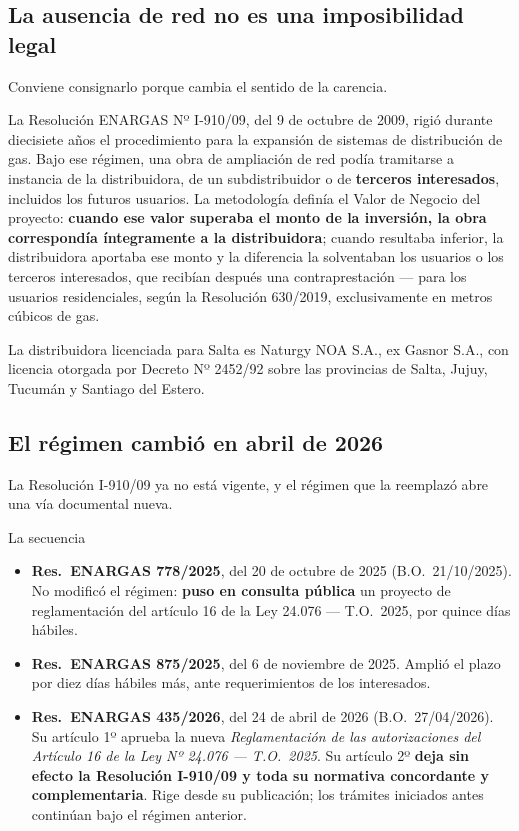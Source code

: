 \subsection*{La ausencia de red no es una imposibilidad legal}

Conviene consignarlo porque cambia el sentido de la carencia.

La Resolución ENARGAS Nº I-910/09, del 9 de octubre de 2009, rigió durante diecisiete años el procedimiento para la expansión de sistemas de distribución de gas. Bajo ese régimen, una obra de ampliación de red podía tramitarse a instancia de la distribuidora, de un subdistribuidor o de \textbf{terceros interesados}, incluidos los futuros usuarios. La metodología definía el Valor de Negocio del proyecto: \textbf{cuando ese valor superaba el monto de la inversión, la obra correspondía íntegramente a la distribuidora}; cuando resultaba inferior, la distribuidora aportaba ese monto y la diferencia la solventaban los usuarios o los terceros interesados, que recibían después una contraprestación --- para los usuarios residenciales, según la Resolución 630/2019, exclusivamente en metros cúbicos de gas.

La distribuidora licenciada para Salta es Naturgy NOA S.A., ex Gasnor S.A., con licencia otorgada por Decreto Nº 2452/92 sobre las provincias de Salta, Jujuy, Tucumán y Santiago del Estero.

\subsection*{El régimen cambió en abril de 2026}

La Resolución I-910/09 ya no está vigente, y el régimen que la reemplazó abre una vía documental nueva.

\begin{ficha}{La secuencia}
\begin{itemize}[leftmargin=*,nosep]
\item \textbf{Res.\ ENARGAS 778/2025}, del 20 de octubre de 2025 (B.O.\ 21/10/2025). No modificó el régimen: \textbf{puso en consulta pública} un proyecto de reglamentación del artículo 16 de la Ley 24.076 --- T.O.\ 2025, por quince días hábiles.
\item \textbf{Res.\ ENARGAS 875/2025}, del 6 de noviembre de 2025. Amplió el plazo por diez días hábiles más, ante requerimientos de los interesados.
\item \textbf{Res.\ ENARGAS 435/2026}, del 24 de abril de 2026 (B.O.\ 27/04/2026). Su artículo 1º aprueba la nueva \textit{Reglamentación de las autorizaciones del Artículo 16 de la Ley Nº 24.076 --- T.O.\ 2025}. Su artículo 2º \textbf{deja sin efecto la Resolución I-910/09 y toda su normativa concordante y complementaria}. Rige desde su publicación; los trámites iniciados antes continúan bajo el régimen anterior.
\end{itemize}
\end{ficha}

